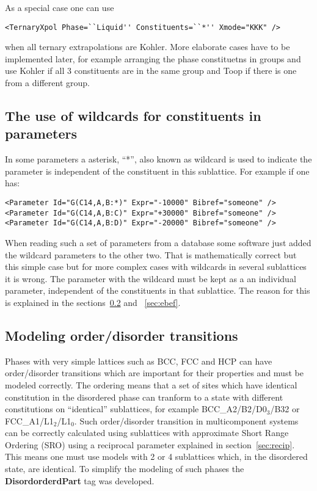 \documentclass{article}
\begin{document}
\begin{appendices}
As a special case one can use

\begin{verbatim}
<TernaryXpol Phase=``Liquid'' Constituents=``*'' Xmode="KKK" />
\end{verbatim}
\noindent
when all ternary extrapolations are Kohler.  More elaborate cases have
to be implemented later, for example arranging the phase constituetns
in groups and use Kohler if all 3 constituents are in the same group
and Toop if there is one from a different group.

\subsection{The use of wildcards for constituents in parameters}\label{sec:wildcard}

In some parameters a asterisk, ``*'', also known as wildcard is used
to indicate the parameter is independent of the constituent in this
sublattice.  For example if one has:

\begin{verbatim}
<Parameter Id="G(C14,A,B:*)" Expr="-10000" Bibref="someone" />
<Parameter Id="G(C14,A,B:C)" Expr="+30000" Bibref="someone" />
<Parameter Id="G(C14,A,B:D)" Expr="-20000" Bibref="someone" />
\end{verbatim}

When reading such a set of parameters from a database some software
just added the wildcard parameters to the other two.  That is
mathematically correct but this simple case but for more complex cases
with wildcards in several sublattices it is wrong.  The parameter with
the wildcard must be kept as a an individual parameter, independent of
the constituents in that sublattice.  The reason for this is explained
in the sections~\ref{sec:OD} and ~\ref{sec:ebef}.

\subsection{Modeling order/disorder transitions}\label{sec:OD}

Phases with very simple lattices such as BCC, FCC and HCP can have
order/disorder transitions which are important for their properties
and must be modeled correctly.  The ordering means that a set of sites
which have identical constitution in the disordered phase can tranform
to a state with different constitutions on ``identical'' sublattices,
for example BCC\_A2/B2/D0$_3$/B32 or FCC\_A1/L1$_2$/L1$_0$.  Such
order/disorder transition in multicomponent systems can be correctly
calculated using sublattices with approximate Short Range Ordering
(SRO) using a reciprocal parameter explained in
section~\ref{sec:recip}.  This means one must use models with 2 or 4
sublattices which, in the disordered state, are identical.  To
simplify the modeling of such phases the {\bf DisordorderdPart} tag
was developed.


\end{appendices}
\end{document}
